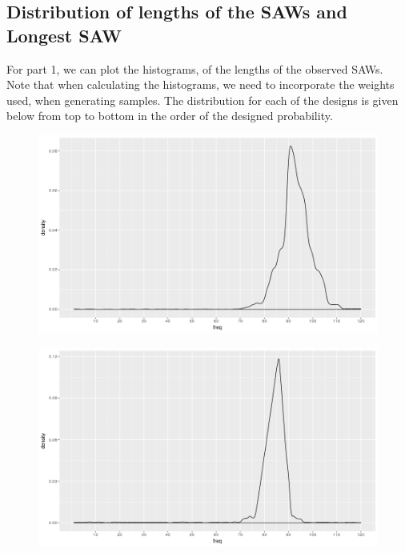 \documentclass[journal, a4paper]{IEEEtran}
\begin{document}
	\subsection{Distribution of lengths of the SAWs and Longest SAW}
	
	For part 1, we can plot the histograms, of the lengths of the observed SAWs. Note that when calculating the histograms, we need to incorporate the weights used,
	when generating samples. The distribution for each of the designs is given below from top to bottom in the order of the designed probability.
	\begin{figure}[h]
	\begin{center}
		\includegraphics[width = 0.9\columnwidth]{d1}
	\end{center}
	\end{figure}
	
	\vspace{-2mm}	
	
	\begin{figure}[h]
	\begin{center}
		\includegraphics[width = 0.9\columnwidth]{d2}
	\end{center}
	\end{figure}
	
\end{document}
